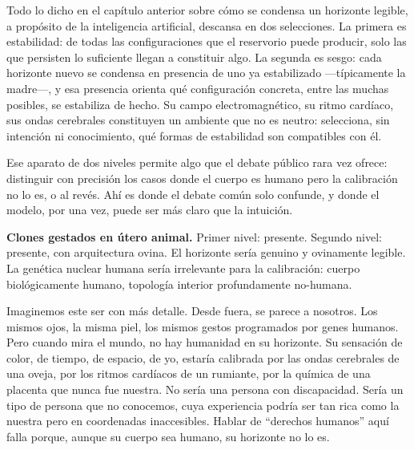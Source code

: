 \noindent {}

Todo lo dicho en el capítulo anterior sobre cómo se condensa un horizonte legible, a propósito de la inteligencia artificial, descansa en dos selecciones. La primera es estabilidad: de todas las configuraciones que el reservorio puede producir, solo las que persisten lo suficiente llegan a constituir algo. La segunda es sesgo: cada horizonte nuevo se condensa en presencia de uno ya estabilizado —típicamente la madre—, y esa presencia orienta qué configuración concreta, entre las muchas posibles, se estabiliza de hecho. Su campo electromagnético, su ritmo cardíaco, sus ondas cerebrales constituyen un ambiente que no es neutro: selecciona, sin intención ni conocimiento, qué formas de estabilidad son compatibles con él.

Ese aparato de dos niveles permite algo que el debate público rara vez ofrece: distinguir con precisión los casos donde el cuerpo es humano pero la calibración no lo es, o al revés. Ahí es donde el debate común solo confunde, y donde el modelo, por una vez, puede ser más claro que la intuición.

\textbf{Clones gestados en útero animal.} Primer nivel: presente. Segundo nivel: presente, con arquitectura ovina. El horizonte sería genuino y ovinamente legible. La genética nuclear humana sería irrelevante para la calibración: cuerpo biológicamente humano, topología interior profundamente no-humana.

Imaginemos este ser con más detalle. Desde fuera, se parece a nosotros. Los mismos ojos, la misma piel, los mismos gestos programados por genes humanos. Pero cuando mira el mundo, no hay humanidad en su horizonte. Su sensación de color, de tiempo, de espacio, de yo, estaría calibrada por las ondas cerebrales de una oveja, por los ritmos cardíacos de un rumiante, por la química de una placenta que nunca fue nuestra. No sería una persona con discapacidad. Sería un tipo de persona que no conocemos, cuya experiencia podría ser tan rica como la nuestra pero en coordenadas inaccesibles. Hablar de “derechos humanos” aquí falla porque, aunque su cuerpo sea humano, su horizonte no lo es.

